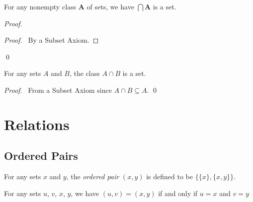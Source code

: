 \begin{theorem}[Subset]
    For any nonempty class $\mathbf{A}$ of sets, we have $\bigcap \mathbf{A}$
    is a set.
\end{theorem}

\begin{proof}
    \pf
    \qedstep
    \begin{proof}
        \pf\ By a Subset Axiom.
    \end{proof}
    \qed
\end{proof}

\begin{theorem}[Subset]
    For any sets $A$ and $B$, the class $A \cap B$ is a set.
\end{theorem}

\begin{proof}
    \pf\ From a Subset Axiom since $A \cap B \subseteq A$. \qed
\end{proof}

\chapter{Relations}

\section{Ordered Pairs}

\begin{definition}
    For any sets $x$ and $y$, the \emph{ordered pair} $(x,y)$ is defined to be $\{ \{ x \}, \{ x , y \} \}$.    
\end{definition}

\begin{theorem}[Pairing]
    For any sets $u$, $v$, $x$, $y$, we have $(u,v) = (x,y)$ if and only if $u = x$ and $v = y$
\end{theorem}

